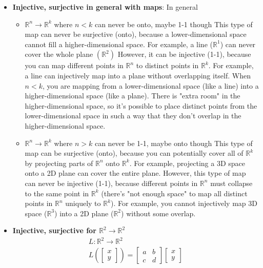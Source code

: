 \documentclass{report}
\begin{document}
\begin{itemize}
            \item \textbf{Injective, surjective in general with maps}: In general
                \begin{itemize}
                    \item $\mathbb{R}^{n} \to \mathbb{R}^{k}$ where $n < k$ can never be onto, maybe 1-1 though
                        \bigbreak \noindent 
                        This type of map can never be surjective (onto), because a lower-dimensional space cannot fill a higher-dimensional space. For example, a line ($\mathbb{R}^{1}$) can never cover the whole plane $(\mathbb{R}^{2}) $
                        \bigbreak \noindent 
                        However, it can be injective (1-1), because you can map different points in $\mathbb{R}^{n}$ to distinct points in $\mathbb{R}^{k}$. For example, a line can injectively map into a plane without overlapping itself.
                        \bigbreak \noindent 
                        When $n<k$, you are mapping from a lower-dimensional space (like a line) into a higher-dimensional space (like a plane). There is "extra room" in the higher-dimensional space, so it’s possible to place distinct points from the lower-dimensional space in such a way that they don’t overlap in the higher-dimensional space.
                \item $\mathbb{R}^{n} \to \mathbb{R}^{k}$ where $n > k$ can never be 1-1, maybe onto though
                        \bigbreak \noindent 
                        This type of map can be surjective (onto), because you can potentially cover all of $\mathbb{R}^{k}$ by projecting parts of $\mathbb{R}^{n}$ onto $\mathbb{R}^{k}$. For example, projecting a 3D space onto a 2D plane can cover the entire plane.
                        \bigbreak \noindent 
                        However, this type of map can never be injective (1-1), because different points in \( \mathbb{R}^n \) must collapse to the same point in \( \mathbb{R}^k \) (there's "not enough space" to map all distinct points in \( \mathbb{R}^n \) uniquely to \( \mathbb{R}^k \)). For example, you cannot injectively map 3D space (\( \mathbb{R}^3 \)) into a 2D plane (\( \mathbb{R}^2 \)) without some overlap.
                \end{itemize}
            \item \textbf{Injective, surjective for $\mathbb{R}^{2} \to \mathbb{R}^{2}$}
                \begin{align*}
                    L: \mathbb{R}^{2} \to \mathbb{R}^{2} \\
                    L\left( \begin{bmatrix} x \\ y \end{bmatrix}\right) = \begin{bmatrix} a & b \\ c & d \end{bmatrix} \begin{bmatrix} x \\ y \end{bmatrix}

\end{align*}
\end{itemize}
\end{document}

